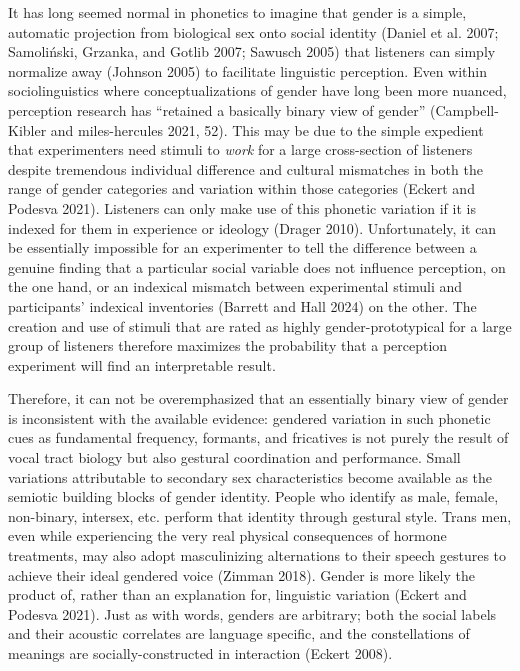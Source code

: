 \documentclass[
  letterpaper,
  DIV=11,
  numbers=noendperiod]{scrartcl}
\begin{document}
It has long seemed normal in phonetics to imagine that gender is a
simple, automatic projection from biological sex onto social identity
(Daniel et al. 2007; Samoliński, Grzanka, and Gotlib 2007; Sawusch 2005)
that listeners can simply normalize away (Johnson 2005) to facilitate
linguistic perception. Even within sociolinguistics where
conceptualizations of gender have long been more nuanced, perception
research has ``retained a basically binary view of gender''
(Campbell-Kibler and miles-hercules 2021, 52). This may be due to the
simple expedient that experimenters need stimuli to \emph{work} for a
large cross-section of listeners despite tremendous individual
difference and cultural mismatches in both the range of gender
categories and variation within those categories (Eckert and Podesva
2021). Listeners can only make use of this phonetic variation if it is
indexed for them in experience or ideology (Drager 2010). Unfortunately,
it can be essentially impossible for an experimenter to tell the
difference between a genuine finding that a particular social variable
does not influence perception, on the one hand, or an indexical mismatch
between experimental stimuli and participants' indexical inventories
(Barrett and Hall 2024) on the other. The creation and use of stimuli
that are rated as highly gender-prototypical for a large group of
listeners therefore maximizes the probability that a perception
experiment will find an interpretable result.

Therefore, it can not be overemphasized that an essentially binary view
of gender is inconsistent with the available evidence: gendered
variation in such phonetic cues as fundamental frequency, formants, and
fricatives is not purely the result of vocal tract biology but also
gestural coordination and performance. Small variations attributable to
secondary sex characteristics become available as the semiotic building
blocks of gender identity. People who identify as male, female,
non-binary, intersex, etc. perform that identity through gestural style.
Trans men, even while experiencing the very real physical consequences
of hormone treatments, may also adopt masculinizing alternations to
their speech gestures to achieve their ideal gendered voice (Zimman
2018). Gender is more likely the product of, rather than an explanation
for, linguistic variation (Eckert and Podesva 2021). Just as with words,
genders are arbitrary; both the social labels and their acoustic
correlates are language specific, and the constellations of meanings are
socially-constructed in interaction (Eckert 2008).
\end{document}
